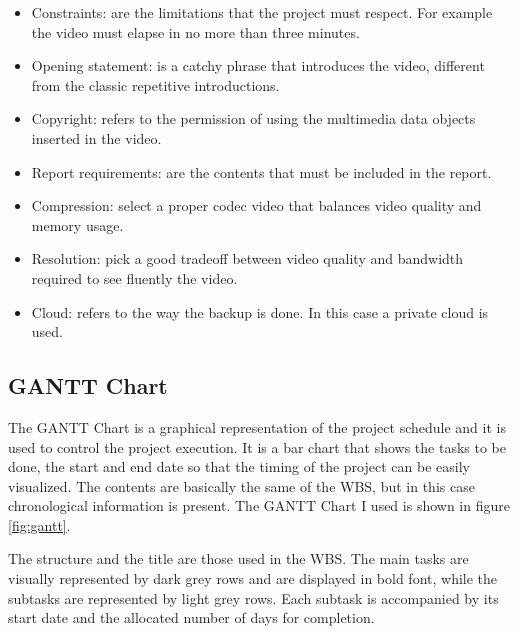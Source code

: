 \documentclass{article}
\begin{document}
\begin{multicols}{2}
    \begin{itemize}[leftmargin=*]
    \item Constraints: are the limitations that the project must respect. For example the video must elapse in no more than three minutes.
    \item Opening statement: is a catchy phrase that introduces the video, different from the classic repetitive introductions.
    \item Copyright: refers to the permission of using the multimedia data objects inserted in the video.
    \item Report requirements: are the contents that must be included in the report.
    \item Compression: select a proper codec video that balances video quality and memory usage.
    \item Resolution: pick a good tradeoff between video quality and bandwidth required to see fluently the video.
    \item Cloud: refers to the way the backup is done. In this case a private cloud is used.
    \end{itemize}
    \clearpage

    \subsection{GANTT Chart}
    The GANTT Chart is a graphical representation of the project schedule and it is used to control the project execution. It is a bar chart that shows the tasks to be done, the start and end date
    so that the timing of the project can be easily visualized. The contents are basically the same of the WBS, but in this case chronological information is present.
    The GANTT Chart I used is shown in figure \ref{fig:gantt}.

    \noindent
    The structure and the title are those used in the WBS. The main tasks are visually represented by dark grey rows and are displayed in bold font, while the 
    subtasks are represented by light grey rows. Each subtask is accompanied by its start date and the allocated number of days for completion.
    

\end{multicols}
\end{document}
